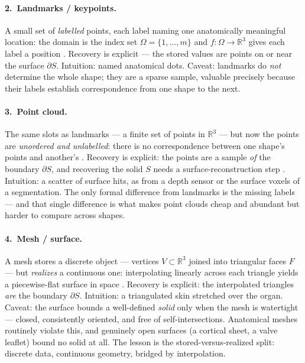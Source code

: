 %
\paragraph{2.~Landmarks / keypoints.} A small set of \emph{labelled} points, each label
naming one anatomically meaningful location: the domain is the index set
$\Omega = \{1, \dots, m\}$ and $f : \Omega \to \mathbb{R}^3$ gives each label a position
\citep{cootes1995active}. Recovery is explicit --- the stored values are points on or near
the surface $\partial S$. Intuition: named anatomical dots. Caveat: landmarks do
\emph{not} determine the whole shape; they are a sparse sample, valuable precisely because
their labels establish correspondence from one shape to the next.

%
\paragraph{3.~Point cloud.} The same slots as landmarks --- a finite set of points in
$\mathbb{R}^3$ --- but now the points are \emph{unordered and unlabelled}: there is no
correspondence between one shape's points and another's
\citep{qi2017pointnet, wang2019dgcnn}. Recovery is explicit: the points are a sample
\emph{of} the boundary $\partial S$, and recovering the solid $S$ needs a
surface-reconstruction step \citep{kazhdan2006poisson}. Intuition: a scatter of surface
hits, as from a depth sensor or the surface voxels of a segmentation. The only formal
difference from landmarks is the missing labels --- and that single difference is what
makes point clouds cheap and abundant but harder to compare across shapes.

%
\paragraph{4.~Mesh / surface.} A mesh stores a discrete object --- vertices
$V \subset \mathbb{R}^3$ joined into triangular faces $F$ --- but \emph{realizes} a
continuous one: interpolating linearly across each triangle yields a piecewise-flat
surface in space \citep{lorensen1987marching}. Recovery is explicit: the interpolated
triangles \emph{are} the boundary $\partial S$. Intuition: a triangulated skin stretched
over the organ. Caveat: the surface bounds a well-defined \emph{solid} only when the mesh
is watertight --- closed, consistently oriented, and free of self-intersections.
Anatomical meshes routinely violate this, and genuinely open surfaces (a cortical sheet, a
valve leaflet) bound no solid at all. The lesson is the stored-versus-realized split:
discrete data, continuous geometry, bridged by interpolation.

